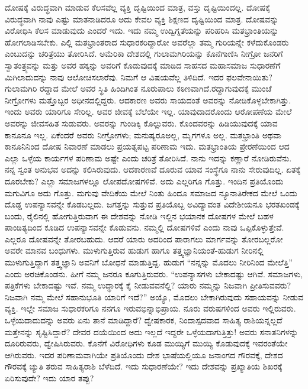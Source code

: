 ದೋಷಕ್ಕೆ ವಿರುದ್ಧವಾಗಿ ಮಾಡುವ ಕೆಲಸವೆಲ್ಲ ವ್ಯಕ್ತಿ ದೃಷ್ಟಿಯಿಂದ ಮಾತ್ರ, ವಸ್ತು ದೃಷ್ಟಿಯಿಂದಲ್ಲ. ದೋಷಕ್ಕೆ ವಿರುದ್ಧವಾಗಿ ನಾವು ಎಷ್ಟು ಮಾತನಾಡಿದರೂ ಅದು ಕೇವಲ ವ್ಯಕ್ತಿ ಶಿಕ್ಷಣದ ದೃಷ್ಟಿಯಿಂದ ಮಾತ್ರ. ದೋಷವನ್ನು ವಿರೋಧಿಸಿ ಕೆಲಸ ಮಾಡುವುದು ಎಂದರೆ ಇದು. ಇದು ನಮ್ಮ ಉದ್ವಿಗ್ನತೆಯನ್ನು ಪರಿಹರಿಸಿ ಮತಭ್ರಾಂತಿಯನ್ನು ಹೋಗಲಾಡಿಸಬೇಕು. ಎಲ್ಲಿ ಮತಭ್ರಾಂತರಾದ ಸುಧಾರಕರಿದ್ದಾರೋ ಅವರೆಲ್ಲಾ ತಮ್ಮ ಗುರಿಯನ್ನೇ ಕಳೆದು\-ಕೊಂಡರು ಎಂಬುದನ್ನು ಚರಿತ್ರೆಯು ತೋರಿಸಿದೆ. ಅಮೆರಿಕಾ ದೇಶದಲ್ಲಿ ಗುಲಾಮಗಿರಿಯನ್ನು ಕೊನೆಗಾಣಿಸಿ ನೀಗ್ರೋ ಜನರಿಗೆ ಸ್ವಾತಂತ್ರ್ಯವನ್ನು ಮತ್ತು ಅವರ ಹಕ್ಕನ್ನು ಅವರಿಗೆ ಕೊಡುವುದಕ್ಕೆ ಮಾಡಿದ ಸಾಹಸದ ಮಹಾಸಮಾಜ ಸುಧಾರಣೆಗೆ ಮಿಗಿಲಾದುದನ್ನು ನಾವು ಆಲೋಚಿಸಲಾರೆವು. ನಿಮಗೆ ಆ ವಿಷಯವೆಲ್ಲ ತಿಳಿದಿದೆ. ಇದರ ಫಲವೇನಾಯಿತು? ಗುಲಾಮಗಿರಿ ರದ್ದಾದ ಮೇಲೆ ಅವರ ಸ್ಥಿತಿ ಹಿಂದಿಗಿಂತ ನೂರುಪಾಲು ಕಠಿಣವಾಗಿದೆ.\break ರದ್ದಾಗುವುದಕ್ಕೆ ಮುಂಚೆ ನೀಗ್ರೋಗಳು ಮತ್ತೊಬ್ಬರ ಅಧೀನದಲ್ಲಿದ್ದರು. ಆದಕಾರಣ ಅವರು ಸಾಯದಂತೆ ಅವರನ್ನು ನೋಡಿಕೊಳ್ಳಬೇಕಾಗಿತ್ತು. ಇಂದು ಅವರು ಯಾರಿಗೂ ಸೇರಿಲ್ಲ. ಅವರ ಜೀವಕ್ಕೆ ಬೆಲೆಯೇ ಇಲ್ಲ. ಯಾವುದಾದರೊಂದು ಆರೋಪಣೆಯ ಮೇಲೆ ಅವರನ್ನು ಜೀವಸಹಿತ ಸುಡುವರು. ಅವರನ್ನು ಗುಂಡಿಕ್ಕಿ ಕೊಲ್ಲುವರು. ಕೊಂದವರನ್ನು ಹಿಡಿಯು\-ವುದಕ್ಕೆ ಯಾವ ಕಾನೂನೂ ಇಲ್ಲ. ಏಕೆಂದರೆ ಅವರು ನೀಗ್ರೋಗಳು; ಮನುಷ್ಯರೂ\break ಅಲ್ಲ, ಮೃಗಗಳೂ ಅಲ್ಲ. ಮತಭ್ರಾಂತಿ ಅಥವಾ ಕಾನೂನಿನಿಂದ ದೋಷ ನಿವಾರಣೆ ಮಾಡಲು ಪ್ರಯತ್ನಪಟ್ಟ ಪರಿಣಾಮ ಇದು. ಮತಭ್ರಾಂತಿಯ ಪ್ರೇರಣೆಯಿಂದ ಆದ ಎಲ್ಲಾ ಒಳ್ಳೆಯ ಕಾರ್ಯಗಳ ಪರಿಣಾಮ ಅಷ್ಟೇ ಎಂದು ಚರಿತ್ರೆ ತೋರಿಸಿದೆ. ನಾನು ಇದನ್ನು ಕಣ್ಣಾರೆ ನೋಡಿರುವೆನು. ನನ್ನ ಸ್ವಂತ ಅನುಭವ ಅದನ್ನು ಕಲಿಸಿರುವುದು. ಆದಕಾರಣವೆ ದೂರುವ ಯಾವ ಸಂಸ್ಥೆಗೂ ನಾನು ಸೇರುವುದಿಲ್ಲ. ಏತಕ್ಕೆ ದೂರಬೇಕು? ಎಲ್ಲಾ ಸಮಾಜಗಳಲ್ಲೂ ಲೋಪದೋಷಗಳಿವೆ. ಅದು ಎಲ್ಲರಿಗೂ ಗೊತ್ತು. ಇಂದಿನ ಪ್ರತಿಯೊಂದು ಮಗುವಿಗೂ ಅದು ಗೊತ್ತು. ಮಗುವು ವೇದಿಕೆಯ ಮೇಲೆ ನಿಂತು ಹಿಂದೂ ಸಮಾಜದ ನ್ಯೂನಾತಿರೇಕದ ಮೇಲೆ ಒಂದು ದೊಡ್ಡ ಉಪನ್ಯಾಸವನ್ನೇ ಕೊಡಬಲ್ಲದು. ಜಗತ್ತನ್ನು ಸುತ್ತುವ ಪ್ರತಿಯೊಬ್ಬ ಅವಿದ್ಯಾವಂತ ವಿದೇಶೀಯನೂ ಭರತಖಂಡಕ್ಕೆ ಬಂದು, ರೈಲಿನಲ್ಲಿ ಹೋಗುತ್ತಿರುವಾಗ ಈ ದೇಶವನ್ನು ನೋಡಿ ಇಲ್ಲಿನ ಭಯಾನಕ ದೋಷಗಳ ಮೇಲೆ ಬಹಳ ಪಾಂಡಿತ್ಯದಿಂದ ಕೂಡಿದ ಉಪನ್ಯಾಸವನ್ನೇ ಕೊಡುವನು. ನಮ್ಮಲ್ಲಿ ದೋಷಗಳಿವೆ ಎಂದು ನಾವು ಒಪ್ಪಿಕೊಳ್ಳುತ್ತೇವೆ. ಎಲ್ಲರೂ ದೋಷವನ್ನೇ ತೋರಬಹುದು. ಆದರೆ ಯಾರು ಅದರಿಂದ ಪಾರಾಗಲು ಮಾರ್ಗವನ್ನು ತೋರಬಲ್ಲರೋ ಅವರೇ ಮಾನವ ಬಂಧುಗಳು. ಮುಳುಗುತ್ತಿರುವ ಹುಡುಗ ಹಾಗೂ ತತ್ತ್ವಜ್ಞಾನಿಯಂತೆ-ಹುಡುಗ ನೀರಿನಲ್ಲಿ ಮುಳುಗುತ್ತಿದ್ದಾಗ ತತ್ತ್ವಜ್ಞಾನಿ ಅವನಿಗೆ ಬೋಧನೆ ಮಾಡುತ್ತಿದ್ದ. ಹುಡುಗ “ನನ್ನನ್ನು ಮೊದಲು ನೀರಿನಿಂದ ಮೇಲೆತ್ತಿ” ಎಂದು ಅರಚಿಕೊಂಡನು. ಹೀಗೆ ನಮ್ಮ ಜನರೂ ಕೂಗುತ್ತಿರುವರು. “ಉಪನ್ಯಾಸಗಳು ಬೇಕಾದಷ್ಟು ಆಗಿವೆ. ಸಮಾಜಗಳು, ಪತ್ರಿಕೆಗಳು ಬೇಕಾದಷ್ಟು ಇವೆ. ನಮ್ಮ ಉದ್ಧಾರಕ್ಕೆ ಕೈ ನೀಡುವವನೆಲ್ಲಿ? ಯಾರು ನಮ್ಮನ್ನು ನಿಜವಾಗಿ ಪ್ರೀತಿಸುವವರು? ನಿಜವಾಗಿ ನಮ್ಮ ಮೇಲೆ ಸಹಾನುಭೂತಿ ಯಾರಿಗೆ ಇದೆ?” ಅಯ್ಯೊ, ಮೊದಲು ಬೇಕಾಗಿರುವುದು ಸಹಾಯವನ್ನು ನೀಡುವ ವ್ಯಕ್ತಿ. ಇಲ್ಲೇ ಸಮಾಜ ಸುಧಾರಕರಿಗೂ ನನಗೂ ಇರುವ\break ಭಿನ್ನಾಭಿಪ್ರಾಯ. ನೂರು ವರುಷಗಳಿಂದ ಅವರು ಇಲ್ಲಿರುವರು. ಒಳ್ಳೆಯದಾದುದನ್ನು ಅವರು ಏನು ತಾನೆ ಮಾಡಿದ್ದಾರೆ? ದ್ವೇಷಕಾರಕ, ನಿಂದಾಸ್ಪದವಾದ ಸಾಹಿತ್ಯ ರಾಶಿಯನ್ನಲ್ಲದೆ ಮತ್ತೇನನ್ನು ಸೃಷ್ಟಿಸಿದ್ದಾರೆ? ದೇವರ ದಯೆಯಿಂದ ಅದು ಇಲ್ಲದೆ ಇದ್ದರೇ ಒಳ್ಳೆಯದಾಗುತ್ತಿತ್ತು! ಅವರು ಸನಾತನಿಗಳನ್ನು ದೂರಿರುವರು, ದ್ವೇಷಿಸಿರುವರು. ಕೊನೆಗೆ ವಿರೋಧಿ\-ಗಳು ಕೂಡ ಮುಯ್ಯಿಗೆ ಮುಯ್ಯಿ ಕೊಡುವುದಕ್ಕೆ ಇವರಂತೆಯೇ ಆಗಿರುವರು. ಇದರ ಪರಿಣಾಮವಾಗಿಯೇ ಪ್ರತಿಯೊಂದು ದೇಶ ಭಾಷೆಯಲ್ಲಿಯೂ ಜನಾಂಗದ ಗೌರವಕ್ಕೆ, ದೇಶದ ಗೌರವಕ್ಕೆ ಚ್ಯುತಿ ತರುವ ಸಾಹಿತ್ಯರಾಶಿ ಬೆಳೆದಿದೆ. ಇದು ಸುಧಾರಣೆಯೇ? ಇದು ದೇಶವನ್ನು ಪ್ರಖ್ಯಾತಿಯ ಶಿಖರಕ್ಕೆ ಏರಿಸುವುದೇ? ಇದು ಯಾರ ತಪ್ಪು?

